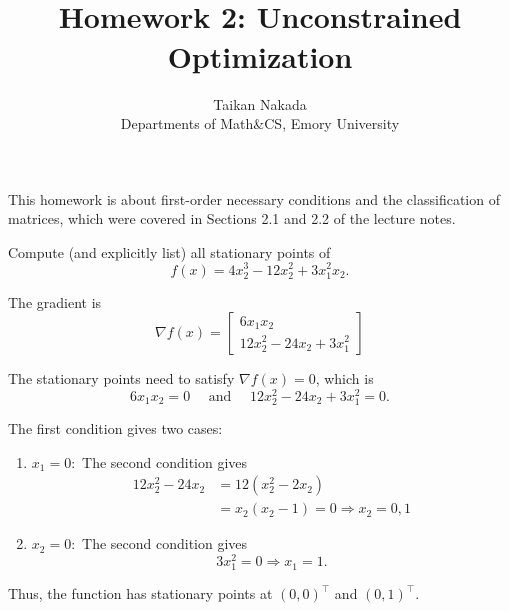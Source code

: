 \documentclass{article}
\title{\\Homework 2: Unconstrained Optimization}
\author{Taikan Nakada\\ Departments of Math\&CS, Emory University}
\begin{document}
	
	This homework is about first-order necessary conditions and the classification of matrices, which were covered in Sections 2.1 and 2.2 of the lecture notes. 
	
	\begin{ex}
		Compute (and explicitly list) all stationary points of
		\begin{equation*}
				f(x) = 4 x_2^3- 12 x_2^2 + 3 x_1^2 x_2.
		\end{equation*}
	\end{ex}
	
	\bigskip
	
	The gradient is 
	\begin{equation*}
	    \nabla f(x) = \left[
	                     \begin{array}{r}
	                        6x_1 x_2 \\
	                        12x_2^2 -24x_2 + 3x_1^2
	                     \end{array}     
	                  \right]
	\end{equation*}
	
    The stationary points need to satisfy $\nabla f(x) = 0$, which is
    \begin{equation*}
        6x_1 x_2 = 0 \quad \text{ and } \quad 
        12x_2^2 -24x_2 + 3x_1^2 = 0.
    \end{equation*}
    
    The first condition gives two cases:
    
    \begin{enumerate}
            \item ${x_1=0 : }$ The second condition gives
            \begin{align*}
                12x_2^2 -24x_2 &= 12\left( x_2^2 -2x_2 \right)\\
                &= x_2\left( x_2 - 1\right) = 0 
                \Rightarrow x_2 = 0,1
            \end{align*}
            \item ${x_2=0 : }$ The second condition gives
            \begin{equation*}
                3 x_1^2 = 0 \Rightarrow x_1 = 1.
            \end{equation*}
        \end{enumerate}
        Thus, the function has stationary points at $(0,0)^\top$ and $(0,1)^\top$.
        
        \bigskip
	
\end{document}
